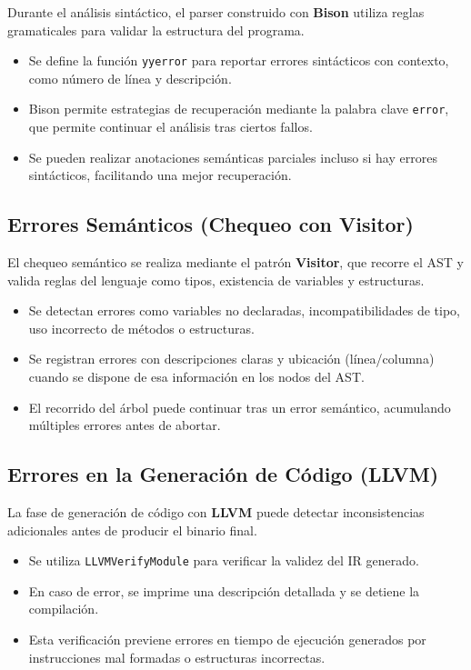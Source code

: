 \documentclass[11pt, a4paper, twoside]{article} %
\begin{document}
Durante el análisis sintáctico, el parser construido con \textbf{Bison} utiliza reglas gramaticales para validar la estructura del programa.

\begin{itemize}
    \item Se define la función \texttt{yyerror} para reportar errores sintácticos con contexto, como número de línea y descripción.
    \item Bison permite estrategias de recuperación mediante la palabra clave \texttt{error}, que permite continuar el análisis tras ciertos fallos.
    \item Se pueden realizar anotaciones semánticas parciales incluso si hay errores sintácticos, facilitando una mejor recuperación.
\end{itemize}

\subsection{Errores Semánticos (Chequeo con Visitor)}

El chequeo semántico se realiza mediante el patrón \textbf{Visitor}, que recorre el AST y valida reglas del lenguaje como tipos, existencia de variables y estructuras.

\begin{itemize}
    \item Se detectan errores como variables no declaradas, incompatibilidades de tipo, uso incorrecto de métodos o estructuras.
    \item Se registran errores con descripciones claras y ubicación (línea/columna) cuando se dispone de esa información en los nodos del AST.
    \item El recorrido del árbol puede continuar tras un error semántico, acumulando múltiples errores antes de abortar.
\end{itemize}

\subsection{Errores en la Generación de Código (LLVM)}

La fase de generación de código con \textbf{LLVM} puede detectar inconsistencias adicionales antes de producir el binario final.

\begin{itemize}
    \item Se utiliza \texttt{LLVMVerifyModule} para verificar la validez del IR generado.
    \item En caso de error, se imprime una descripción detallada y se detiene la compilación.
    \item Esta verificación previene errores en tiempo de ejecución generados por instrucciones mal formadas o estructuras incorrectas.
\end{itemize}
\end{document}
